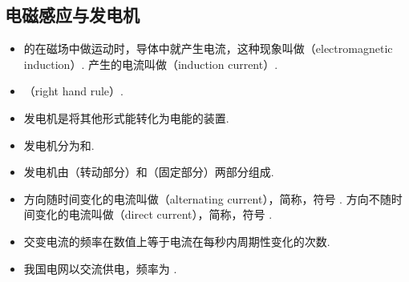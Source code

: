\subsection{电磁感应与发电机}
\begin{itemize}
\item {}的在磁场中做运动时，导体中就产生电流，这种现象叫做（electromagnetic induction）. 产生的电流叫做（induction current）.
\item {}（right hand rule）.
\item 发电机是将其他形式能转化为电能的装置.
\item 发电机分为和.
\item 发电机由（转动部分）和（固定部分）两部分组成.
\item 方向随时间变化的电流叫做（alternating current），简称，符号 . 方向不随时间变化的电流叫做（direct current），简称，符号 .
\item 交变电流的频率在数值上等于电流在每秒内周期性变化的次数. 
\item 我国电网以交流供电，频率为 .
\end{itemize}